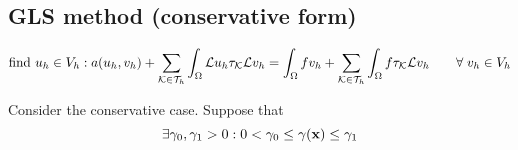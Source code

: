 \subsection{GLS method (conservative form)}
\[
    \text{find }u_h \in V_h : a(u_h, v_h) + \sum_{\mathcal{K} \in \mathcal{T}_h} \int_\Omega \mathcal{L}u_h \tau_{\mathcal{K}} \mathcal{L}v_h = \int_\Omega f v_h + \sum_{\mathcal{K} \in \mathcal{T}_h} \int_\Omega f \tau_{\mathcal{K}} \mathcal{L}v_h \qquad \forall \; v_h \in V_h
\]
\begin{theorem}
    Consider the conservative case. Suppose that 
    \[
        \exists \gamma_0 , \gamma_1 > 0 : 0 < \gamma_0 \leq \gamma(\textbf{x}) \leq \gamma_1
    \]
\end{theorem}